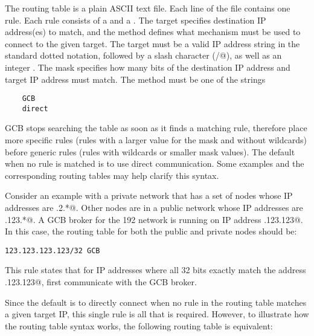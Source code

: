 
The routing table is a plain ASCII text file.
Each line of the file contains one rule.
Each rule consists of a  and a .
The target specifies destination IP address(es) to match, and the method
defines what mechanism must be used to connect to the given target.
The target must be a valid IP address string in the standard
dotted notation, followed by a slash character (\verb@/@),
as well as an integer .
The mask specifies how many bits of the destination IP address
and target IP address must match.
The method must be one of the strings 
\begin{verbatim}
    GCB
    direct
\end{verbatim}
GCB stops searching the table as soon as it finds a matching rule,
therefore place more specific rules
(rules with a larger value for the mask and without wildcards)
before generic rules
(rules with wildcards or smaller mask values).
The default when no rule is matched is to use direct communication.
Some examples and the corresponding routing tables may help clarify
this syntax.



Consider an example with
a private network that has a set of nodes whose IP
addresses are .2.*@.
Other nodes are in a public network 
whose IP addresses are .123.*@.
A GCB broker for the 192
network is running on IP address .123.123@.
In this case, the routing table for both the public and private nodes
should be:

\begin{verbatim}
123.123.123.123/32 GCB
\end{verbatim}

This rule states that for IP addresses where all 32 bits exactly match
the address .123.123@, first communicate with the GCB broker.

Since the default is to directly connect when no rule in the routing
table matches a given target IP, this single rule is all that is
required.
However, to illustrate how the routing table syntax works, the
following routing table is equivalent:

